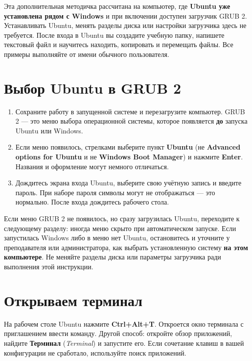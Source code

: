 Эта дополнительная методичка рассчитана на компьютер, где \textbf{Ubuntu
уже установлена рядом с Windows} и при включении доступен загрузчик GRUB
2. Устанавливать Ubuntu, менять разделы диска или настройки загрузчика
здесь не требуется. После входа в Ubuntu вы создадите учебную папку,
напишете текстовый файл и научитесь находить, копировать и перемещать
файлы. Все примеры выполняйте от имени обычного пользователя.

\hypertarget{ux432ux44bux431ux43eux440-ubuntu-ux432-grub-2}{%
\section{Выбор Ubuntu в GRUB
2}\label{ux432ux44bux431ux43eux440-ubuntu-ux432-grub-2}}

\begin{enumerate}
\def\labelenumi{\arabic{enumi}.}
\tightlist
\item
  Сохраните работу в запущенной системе и перезагрузите компьютер. GRUB
  2 --- это меню выбора операционной системы, которое появляется
  \textbf{до} запуска Ubuntu или Windows.
\item
  Если меню появилось, стрелками выберите пункт \textbf{Ubuntu} (не
  \textbf{Advanced options for Ubuntu} и не \textbf{Windows Boot
  Manager}) и нажмите \textbf{Enter}. Названия и оформление могут
  немного отличаться.
\item
  Дождитесь экрана входа Ubuntu, выберите свою учётную запись и введите
  пароль. При наборе пароля символы могут не отображаться --- это
  нормально. После входа дождитесь рабочего стола.
\end{enumerate}

Если меню GRUB 2 не появилось, но сразу загрузилась Ubuntu, переходите к
следующему разделу: иногда меню скрыто при автоматическом запуске. Если
запустилась Windows либо в меню нет Ubuntu, остановитесь и уточните у
преподавателя или администратора, как выбрать установленную систему
\textbf{на этом компьютере}. Не меняйте разделы диска или параметры
загрузчика ради выполнения этой инструкции.

\hypertarget{ux43eux442ux43aux440ux44bux432ux430ux435ux43c-ux442ux435ux440ux43cux438ux43dux430ux43b}{%
\section{Открываем
терминал}\label{ux43eux442ux43aux440ux44bux432ux430ux435ux43c-ux442ux435ux440ux43cux438ux43dux430ux43b}}

На рабочем столе Ubuntu нажмите \textbf{Ctrl+Alt+T}. Откроется окно
терминала с приглашением ввести команду. Другой способ: откройте обзор
приложений, найдите \textbf{Терминал} (\emph{Terminal}) и запустите его.
Если сочетание клавиш в вашей конфигурации не сработало, используйте
поиск приложений.

